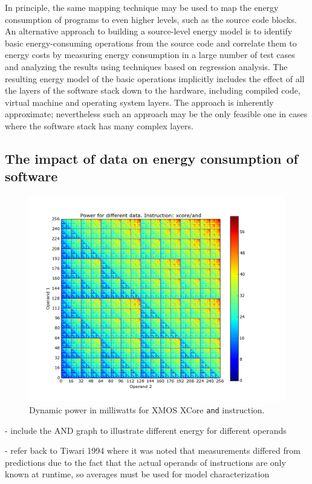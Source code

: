 In principle, the same mapping technique may be used to map the energy consumption
of programs to even higher levels, such as the source code blocks. 
%
An alternative approach to building a source-level energy model is to identify
basic energy-consuming operations from the source code and correlate them to
energy costs by measuring energy consumption in a large number of test cases
and analyzing the results using techniques based on regression analysis. The
resulting energy model of the basic operations implicitly includes the effect
of all the layers of the software stack down to the hardware, including
compiled code, virtual machine and operating system layers. The approach is
inherently approximate; nevertheless such an approach may be the only feasible
one in cases where the software stack has many complex layers.

\subsection{The impact of data on energy consumption of software}\label{subsec:data}

\begin{figure}
    \centering
    \includegraphics[width = 0.85\linewidth]{and_map}
    \caption{Dynamic power in milliwatts for XMOS XCore {\tt and} instruction.}
    \label{f:and-heatmap}
\end{figure}


- include the AND graph to illustrate different energy for different operands 

- refer back to Tiwari 1994 where it was noted that measurements differed from predictions due to the fact that the actual operands of instructions are only known at runtime, so averages must be used for model characterization

